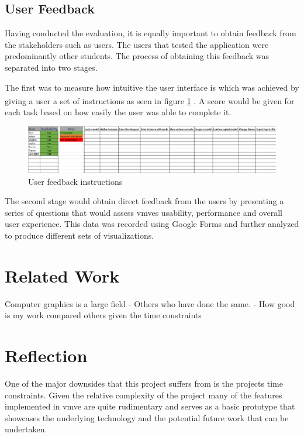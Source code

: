 \documentclass[11pt]{article}
\begin{document}
\subsection{User Feedback}
Having conducted the evaluation, it is equally important to obtain feedback from
the stakeholders such as users. The users that tested the application were
predominantly other students. The process of obtaining this feedback was
separated into two stages.

The first was to measure how intuitive the user interface is which was achieved
by giving a user a set of instructions as seen in figure \ref{fig:instructions}
\textsuperscript{}.
A score would be given for each task based on how easily the user was able to
complete it.

\begin{figure}[H]
  \centering
  \includegraphics[width=\textwidth]{images/user_instructions.png}
  \caption{User feedback instructions }
  \label{fig:instructions}
\end{figure}

The second stage would obtain direct feedback from the users by presenting a
series of questions that would assess \glspl*{vmve} usability, performance and
overall user experience. This data was recorded using Google Forms and further
analyzed to produce different sets of visualizations.

\clearpage
\section{Related Work}
Computer graphics is a large field 
- Others who have done the same.
- How good is my work compared others given the time constraints

\clearpage
\section{Reflection}

One of the major downsides that this project suffers from is the projects time
constraints. Given the relative complexity of the project many of the features
implemented in \gls*{vmve} are quite rudimentary and serves as a basic prototype that
showcases the underlying technology and the potential future work that can be
undertaken.
\end{document}
